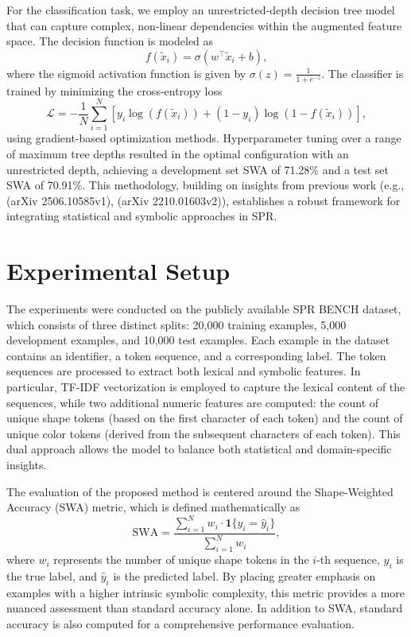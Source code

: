 \documentclass{article}
\begin{document}
For the classification task, we employ an unrestricted-depth decision tree model that can capture complex, non-linear dependencies within the augmented feature space. The decision function is modeled as
\[
f(\tilde{x}_i) = \sigma\left( w^{\top} \tilde{x}_i + b \right),
\]
where the sigmoid activation function is given by \( \sigma(z) = \frac{1}{1+e^{-z}} \). The classifier is trained by minimizing the cross-entropy loss
\[
\mathcal{L} = -\frac{1}{N} \sum_{i=1}^{N} \left[ y_i \log\left(f(\tilde{x}_i)\right) + (1-y_i) \log\left(1-f(\tilde{x}_i)\right) \right],
\]
using gradient-based optimization methods. Hyperparameter tuning over a range of maximum tree depths resulted in the optimal configuration with an unrestricted depth, achieving a development set SWA of 71.28\% and a test set SWA of 70.91\%. This methodology, building on insights from previous work (e.g., (arXiv 2506.10585v1), (arXiv 2210.01603v2)), establishes a robust framework for integrating statistical and symbolic approaches in SPR.

\section{Experimental Setup}
The experiments were conducted on the publicly available SPR BENCH dataset, which consists of three distinct splits: 20,000 training examples, 5,000 development examples, and 10,000 test examples. Each example in the dataset contains an identifier, a token sequence, and a corresponding label. The token sequences are processed to extract both lexical and symbolic features. In particular, TF-IDF vectorization is employed to capture the lexical content of the sequences, while two additional numeric features are computed: the count of unique shape tokens (based on the first character of each token) and the count of unique color tokens (derived from the subsequent characters of each token). This dual approach allows the model to balance both statistical and domain-specific insights.

The evaluation of the proposed method is centered around the Shape-Weighted Accuracy (SWA) metric, which is defined mathematically as
\[
\text{SWA} = \frac{\sum_{i=1}^{N} w_i \cdot \mathbf{1}\{y_i = \hat{y}_i\}}{\sum_{i=1}^{N} w_i},
\]
where \(w_i\) represents the number of unique shape tokens in the \(i\)-th sequence, \(y_i\) is the true label, and \(\hat{y}_i\) is the predicted label. By placing greater emphasis on examples with a higher intrinsic symbolic complexity, this metric provides a more nuanced assessment than standard accuracy alone. In addition to SWA, standard accuracy is also computed for a comprehensive performance evaluation.
\end{document}

